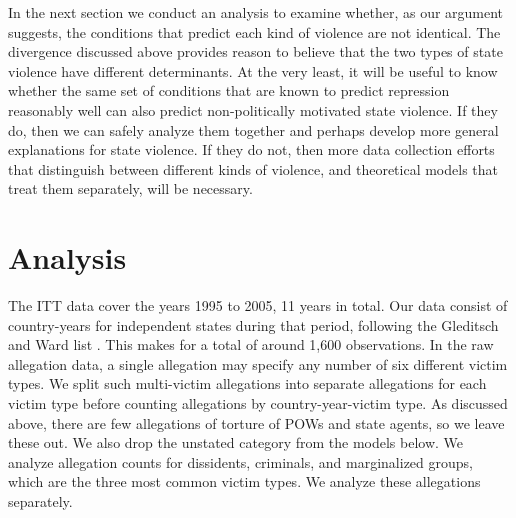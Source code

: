 \documentclass[11pt]{article}
\begin{document}
In the next section we conduct an analysis to examine whether, as our argument suggests, the conditions that predict each kind of violence are not identical. The divergence discussed above provides reason to believe that the two types of state violence have different determinants. At the very least, it will be useful to know whether the same set of conditions that are known to predict repression reasonably well can also predict non-politically motivated state violence. If they do, then we can safely analyze them together and perhaps develop more general explanations for state violence. If they do not, then more data collection efforts that distinguish between different kinds of violence, and theoretical models that treat them separately, will be necessary.  

\section*{Analysis}

The ITT data cover the years 1995 to 2005, 11 years in total. Our data consist of country-years for independent states during that period, following the Gleditsch and Ward list \citep{gleditsch:ward:1999}. This makes for a total of around 1,600 observations. In the raw allegation data, a single allegation may specify any number of six different victim types. We split such multi-victim allegations into separate allegations for each victim type before counting allegations by country-year-victim type. As discussed above, there are few allegations of torture of POWs and state agents, so we leave these out. We also drop the unstated category from the models below. We analyze allegation counts for dissidents, criminals, and marginalized groups, which are the three most common victim types. We analyze these allegations separately. 
\end{document}
